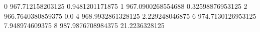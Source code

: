 0 967.712158203125 0.9481201171875
1 967.0900268554688 0.32598876953125
2 966.7640380859375 0.0
4 968.9932861328125 2.229248046875
6 974.7130126953125 7.948974609375
8 987.9876708984375 21.2236328125
